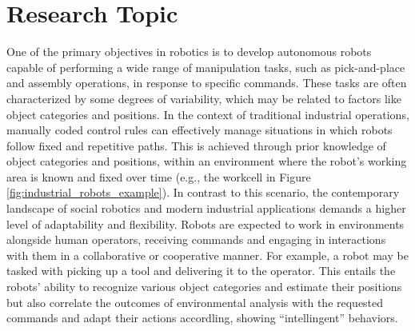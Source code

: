 \section{Research Topic}
\label{sec:research_topic}
One of the primary objectives in robotics is to develop autonomous robots capable of performing a wide range of manipulation tasks, such as pick-and-place and assembly operations, in response to specific commands. These tasks are often characterized by some degrees of variability, which may be related to factors like object categories and positions.
\newline In the context of traditional industrial operations, manually coded control rules can effectively manage situations in which robots follow fixed and repetitive paths. This is achieved through prior knowledge of object categories and positions, within an environment where the robot's working area is known and fixed over time (e.g., the workcell in Figure \ref{fig:industrial_robots_example}). In contrast to this scenario, the contemporary landscape of social robotics and modern industrial applications demands a higher level of adaptability and flexibility. Robots are expected to work in environments alongside human operators, receiving commands and engaging in interactions with them in a collaborative or cooperative manner. For example, a robot may be tasked with picking up a tool and delivering it to the operator. This entails the robots' ability to recognize various object categories and estimate their positions but also correlate the outcomes of environmental analysis with the requested commands and adapt their actions accordling, showing ``intellingent'' behaviors.

